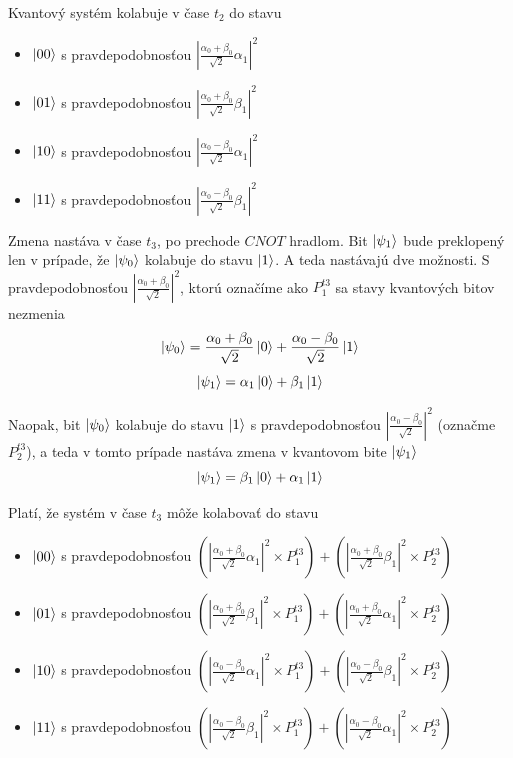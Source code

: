 Kvantový systém kolabuje v čase \(t_2\) do stavu

    \begin{itemize}
        \item[] \(\ket{00}\) s pravdepodobnosťou \(|\frac{\alpha_0 + \beta_0}{\sqrt{2}}\alpha_1|^2\)
        \item[] \(\ket{01}\) s pravdepodobnosťou \(|\frac{\alpha_0 + \beta_0}{\sqrt{2}}\beta_1|^2\)
        \item[] \(\ket{10}\) s pravdepodobnosťou \(|\frac{\alpha_0 - \beta_0}{\sqrt{2}}\alpha_1|^2\)
        \item[] \(\ket{11}\) s pravdepodobnosťou \(|\frac{\alpha_0 - \beta_0}{\sqrt{2}}\beta_1|^2\) 
    \end{itemize}

Zmena nastáva v čase \(t_3\), po prechode \(CNOT\) hradlom. Bit \(\ket{\psi_1}\)
bude preklopený len v prípade, že \(\ket{\psi_0}\) kolabuje do stavu 
\(\ket{1}\). A teda nastávajú dve možnosti. S pravdepodobnosťou 
\(|\frac{\alpha_0 + \beta_0}{\sqrt{2}}|^2\), ktorú označíme ako \(P^{t3}_1\) sa 
stavy kvantových bitov nezmenia
\[\ket{\psi_0} = \frac{\alpha_0 + \beta_0}{\sqrt{2}}\ket{0} + \frac{\alpha_0 - \beta_0}{\sqrt{2}}\ket{1}\]
\[\ket{\psi_1} = \alpha_1\ket{0} + \beta_1\ket{1}\]

Naopak, bit \(\ket{\psi_0}\) kolabuje do stavu \(\ket{1}\) s pravdepodobnosťou
\(|\frac{\alpha_0 - \beta_0}{\sqrt{2}}|^2\) (označme \(P^{t3}_{2}\)), a teda 
v tomto prípade nastáva zmena v kvantovom bite \(\ket{\psi_1}\)
\[\ket{\psi_1} = \beta_1\ket{0} + \alpha_1\ket{1}\]

Platí, že systém v čase \(t_3\) môže kolabovať do stavu
    \begin{itemize}
        \item[] \(\ket{00}\) s pravdepodobnosťou \((|\frac{\alpha_0 + \beta_0}{\sqrt{2}}\alpha_1|^2 \times P^{t3}_1) + (|\frac{\alpha_0 + \beta_0}{\sqrt{2}}\beta_1|^2 \times P^{t3}_{2})\)
        \item[] \(\ket{01}\) s pravdepodobnosťou \((|\frac{\alpha_0 + \beta_0}{\sqrt{2}}\beta_1|^2 \times P^{t3}_1 ) +(|\frac{\alpha_0 + \beta_0}{\sqrt{2}}\alpha_1|^2 \times P^{t3}_2)\)
        \item[] \(\ket{10}\) s pravdepodobnosťou \((|\frac{\alpha_0 - \beta_0}{\sqrt{2}}\alpha_1|^2 \times P^{t3}_1) +  (|\frac{\alpha_0 - \beta_0}{\sqrt{2}}\beta_1|^2 \times P^{t3}_2)\)
        \item[] \(\ket{11}\) s pravdepodobnosťou \((|\frac{\alpha_0 - \beta_0}{\sqrt{2}}\beta_1|^2 \times P^{t3}_1) +(|\frac{\alpha_0 - \beta_0}{\sqrt{2}}\alpha_1|^2 \times P^{t3}_2)\) 
    \end{itemize}


